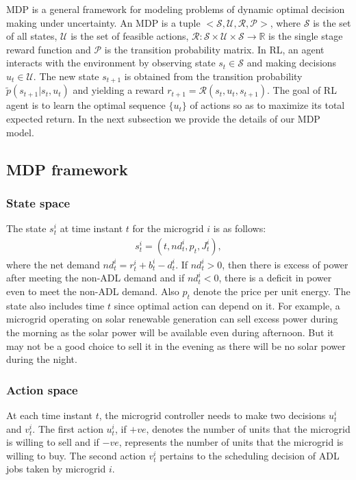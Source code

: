 MDP is a general framework for modeling problems of dynamic optimal decision making under uncertainty. An MDP is a tuple $<\mathcal{S},\mathcal{U},\mathcal{R},\mathcal{P}>$, where $\mathcal{S}$ is the set of all states, $\mathcal{U}$ is the set of  feasible actions, $\mathcal{R}:\mathcal{S}\times\mathcal{U}\times\mathcal{S}\to \mathbb{R} $ is the single stage reward function and $\mathcal{P}$ is the transition probability matrix. In RL, an agent interacts with the environment by observing state $s_t \in \mathcal{S}$ and  making decisions $u_t \in \mathcal{U}$. The new state $s_{t+1}$ is obtained from the transition probability $ \tilde p(s_{t+1} | s_t,u_t)$ and yielding a reward $r_{t+1} = \mathcal{R}(s_t,u_t,s_{t+1})$. The goal of  RL agent is to learn the optimal sequence $\{u_t\}$ of actions so as to maximize its total expected return.
 In the next subsection we provide the details of our MDP model.
\subsection{MDP framework}
\subsubsection{State space}
The state $s_{t}^{i}$ at time instant $t$  for the microgrid $i$ is as follows:
\begin{align}
s_{t}^{i} = (t,nd_{t}^{i},p_{t}, J_{t}^{i}),
\end{align}
where the net demand $nd_{t}^{i} = r_{t}^{i} + b_{t}^{i} - d_{t}^{i}$.
If $nd_{t}^{i} > 0$, then  there is excess of power after meeting the non-ADL demand and if $nd_{t}^{i} < 0$, there is a deficit in power even to meet the non-ADL demand. Also $p_{t}$ denote the price per unit energy. The state also includes time $t$ since optimal action can depend on it. For example, a microgrid operating on solar renewable generation can sell excess power during the morning as the solar power will be available even during afternoon. But it may not be a good choice to sell it in the evening as there will be no solar power during the night. 
\subsubsection{Action space}
At each time instant $t$, the microgrid controller needs to make two decisions $u_{t}^{i}$ and $v_{t}^{i}$. The first action $u_{t}^{i}$, if $+ve$, denotes the number of units that the microgrid is willing to sell and if $-ve$, represents the number of units that the microgrid is willing to buy. The second action $v_{t}^{i}$ pertains to the scheduling decision of ADL jobs taken by microgrid $i$.

